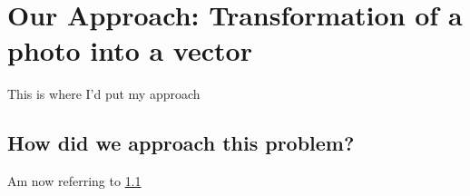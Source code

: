 \chapter{Our Approach: Transformation of a photo into a vector}
\label {chap:approach}

This is where I'd put my approach

\section{How did we approach this problem?}
\label{sec:approach_question}

Am now referring to \ref{sec:approach_question}